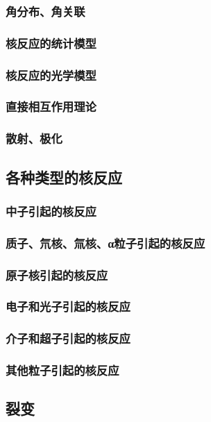 \documentclass[UTF8]{../06-Physics}
\begin{document}
        \subsubsection{角分布、角关联}
        \subsubsection{核反应的统计模型}
        \subsubsection{核反应的光学模型}
        \subsubsection{直接相互作用理论}
        \subsubsection{散射、极化}
    \subsection{各种类型的核反应}
        \subsubsection{中子引起的核反应}
        \subsubsection{质子、氘核、氚核、α粒子引起的核反应}
        \subsubsection{原子核引起的核反应}
        \subsubsection{电子和光子引起的核反应}
        \subsubsection{介子和超子引起的核反应}
        \subsubsection{其他粒子引起的核反应}
    \subsection{裂变}
\end{document}
